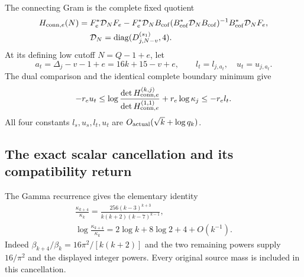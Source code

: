 \documentclass[11pt,a4paper]{article}
\begin{document}
The connecting Gram is the complete fixed quotient
\begin{equation}
\begin{split}
 H_{{\rm conn},e}(N)={}&F_e^*\mathcal D_NF_e
 -F_e^*\mathcal D_NB_{\rm cof}
 (B_{\rm cof}^*\mathcal D_NB_{\rm cof})^{-1}
 B_{\rm cof}^*\mathcal D_NF_e,\\
 &\mathcal D_N=\operatorname{diag}(D_{j,N-v}^{(s_1)},4).
\end{split}\label{eq:conn}
\end{equation}
At its defining low cutoff $N=Q-1+e$, let
\begin{equation}
 a_t=\Delta_j-v-1+e=16k+15-v+e,
 \qquad l_t=l_{j,a_t},\quad u_t=u_{j,a_t}.
 \label{eq:atgt}
\end{equation}
The dual comparison and the identical complete boundary minimum give
\begin{equation}
 -r_eu_t\le
 \log\frac{\det H_{{\rm conn},e}^{(k,j)}}{
                 \det H_{{\rm conn},e}^{(1,1)}}
       +r_e\log\kappa_j
 \le-r_el_t.
 \label{eq:targetorder}
\end{equation}
All four constants $l_s,u_s,l_t,u_t$ are $O_{\rm actual}(\sqrt k+\log q_k)$.

\subsection{The exact scalar cancellation and its compatibility return}
The Gamma recurrence gives the elementary identity
\begin{equation}
\boxed{\begin{gathered}
 \frac{\kappa_{k+4}}{\kappa_k}
 =\frac{256(k-3)^{k+3}}{k(k+2)(k-7)^{k-1}},\\
 \log\frac{\kappa_{k+4}}{\kappa_k}
 =2\log k+8\log2+4+O(k^{-1}).
\end{gathered}}
\label{eq:kappapair}
\end{equation}
Indeed $\beta_{k+4}/\beta_k=16\pi^2/[k(k+2)]$ and the two remaining powers supply $16/\pi^2$ and the displayed integer powers. Every original source mass is included in this cancellation.
\end{document}
